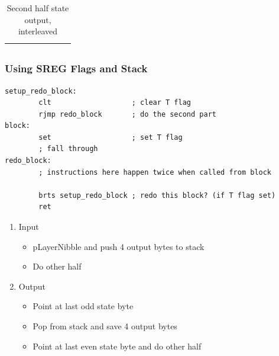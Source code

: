 \documentclass{beamer}
\begin{document}
\begin{frame}[fragile]
  \begin{table}
  \begin{tabular}{  C  C  C  C  C  C  C  C }
    \hline                        
        &  &  &  &  &  &  &  \\
    \hline  
  \end{tabular}
  \caption*{Second half state output, interleaved}
  \end{table}
\end{frame}


%

\begin{frame}[fragile]
\frametitle{Using SREG Flags and Stack}
\begin{lstlisting}
setup_redo_block:
        clt                   ; clear T flag
        rjmp redo_block       ; do the second part
block:
        set                   ; set T flag
        ; fall through
redo_block:
        ; instructions here happen twice when called from block

        brts setup_redo_block ; redo this block? (if T flag set)
        ret
\end{lstlisting}
\begin{enumerate}
\item Input
  \begin{itemize}
    \item pLayerNibble and push 4 output bytes to stack
    \item Do other half
  \end{itemize}
\item Output
  \begin{itemize}
    \item Point at last odd state byte
    \item Pop from stack and save 4 output bytes
    \item Point at last even state byte and do other half
  \end{itemize}
\end{enumerate}
\end{frame}
\end{document}
